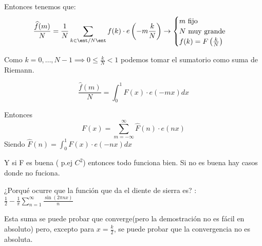 Entonces tenemos que:
$$\frac{\widehat{f}(m)}{N} = \frac{1}{N} \sum_{k \in \ent/N\ent} f(k) \cdot e\left(-m \frac{k}{N}\right) \rightarrow \begin{cases}
	m \text{ fijo}\\
	N \text{ muy grande}\\
	f(k) = F\left(\frac{k}{N}\right)\\
\end{cases}$$

Como $ k = 0 , \ldots , N-1 \implies 0\leq \frac{k}{N} < 1$ podemos tomar el sumatorio como suma de Riemann.

$$\frac{\widehat{f}(m)}{N} = \int_{0}^{1} F(x) \cdot e(-mx) dx$$

Entonces
$$F(x) = \sum_{m= -\infty}^{\infty} \widehat{F}(n) \cdot e(nx)$$
Siendo $\widehat{F}(n) = \int_{0}^{1} F(x) \cdot e(-nx) dx$

Y si F es buena ( p.ej $C^2$) entonces todo funciona bien.
Si no es buena hay casos donde no fuciona.

¿Porqué ocurre que la función que da el diente de sierra es? : $\frac{1}{2} - \frac{1}{\pi} \sum_{n=1}^{\infty} \frac{\sin(2\pi nx)}{n}$
	
Esta suma se puede probar que converge(pero la demostración no es fácil en absoluto) pero, excepto para $x = \frac{k}{2}$, se puede probar que la convergencia no es absoluta.

